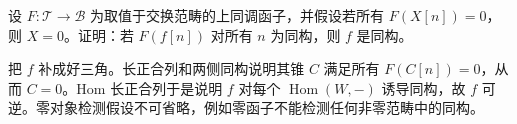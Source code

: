 \begin{exercise}\label{b4:ex:16-cohom-functor-conservative}
	设 \(F:\mathcal T\to\mathcal B\) 为取值于交换范畴的上同调函子，并假设若所有 \(F(X[n])=0\)，则 \(X=0\)。证明：若 \(F(f[n])\) 对所有 \(n\) 为同构，则 \(f\) 是同构。
\end{exercise}
\begin{solution}
	把 \(f\) 补成好三角。长正合列和两侧同构说明其锥 \(C\) 满足所有 \(F(C[n])=0\)，从而 \(C=0\)。Hom 长正合列于是说明 \(f\) 对每个 \(\operatorname{Hom}(W,-)\) 诱导同构，故 \(f\) 可逆。零对象检测假设不可省略，例如零函子不能检测任何非零范畴中的同构。
\end{solution}
